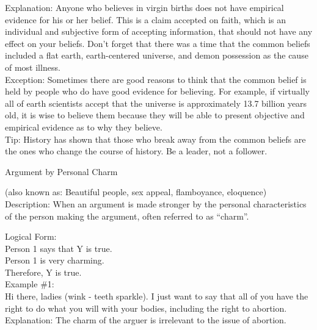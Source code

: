 \documentclass[a4paper,12pt,single,pdftex]{scrbook}
\begin{document}
{    
      Explanation: Anyone who believes in virgin births does not have empirical evidence for his or her belief.  This is a claim accepted on faith, which is an individual and subjective form of accepting information, that should not have any effect on your beliefs.  Don’t forget that there was a time that the common beliefs included a flat earth, earth-centered universe, and demon possession as the cause of most illness.
    \\

    
      Exception: Sometimes there are good reasons to think that the common belief is held by people who do have good evidence for believing.  For example, if virtually all of earth scientists accept that the universe is approximately 13.7 billion years old, it is wise to believe them because they will be able to present objective and empirical evidence as to why they believe.
    \\

    
      Tip: History has shown that those who break away from the common beliefs are the ones who change the course of history.  Be a leader, not a follower.
    \\

  }


Argument by Personal Charm
    
      (also known as: Beautiful people, sex appeal, flamboyance, eloquence)
    \\

  
    Description: When an argument is made stronger by the personal characteristics of the person making the argument, often referred to as “charm”.

    
      Logical Form:
    \\

    
      Person 1 says that Y is true.
    \\

    
      Person 1 is very charming.
    \\

    
      Therefore, Y is true.
    \\

    
      Example \#1:
    \\

    
      Hi there, ladies (wink - teeth sparkle). I just want to say that all of you have the right to do what you will with your bodies, including the right to abortion.
    \\

    
      Explanation: The charm of the arguer is irrelevant to the issue of abortion.
    \\
\end{document}
